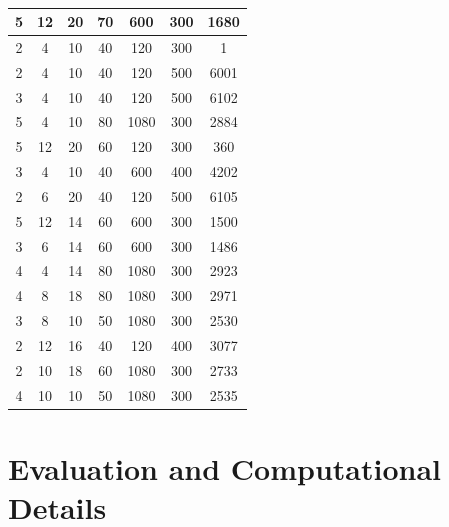 \documentclass[a4paper]{article}
\begin{document}
\begin{table}
\begin{tabular}{ccccccc}
5	&12	&20	&70	&600	&300	&1680	\\
		\hline
2	&4	&10	&40	&120	&300	&1	\\
2	&4	&10	&40	&120	&500	&6001	\\
3	&4	&10	&40	&120	&500	&6102	\\
5	&4	&10	&80	&1080	&300	&2884	\\
5	&12	&20	&60	&120	&300	&360	\\
		\hline
3	&4	&10	&40	&600	&400	&4202	\\
2	&6	&20	&40	&120	&500	&6105	\\
5	&12	&14	&60	&600	&300	&1500	\\
3	&6	&14	&60	&600	&300	&1486	\\
4	&4	&14	&80	&1080	&300	&2923	\\
		\hline
4	&8	&18	&80	&1080	&300	&2971	\\
3	&8	&10	&50	&1080	&300	&2530	\\
2	&12	&16	&40	&120	&400	&3077	\\
2	&10	&18	&60	&1080	&300	&2733	\\
4	&10	&10	&50	&1080	&300	&2535	\\
		\hline
		\hline
	\end{tabular}
	\caption{}
	\label{tab:emma}
\end{table}
\fi


\section{Evaluation and Computational Details}
\end{document}
